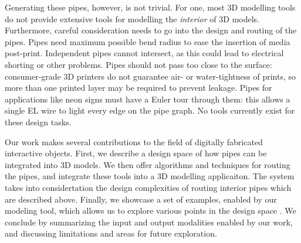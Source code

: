 Generating these pipes, however, is not trivial.  For one, most 3D modelling tools do not provide extensive tools for modelling the  {\em interior} of 3D models. Furthermore, careful consideration needs to go into the design and routing of the pipes. Pipes need maximum possible bend radius to ease the insertion of media post-print.  Independent pipes cannot intersect, as this could lead to electrical shorting or other problems.  Pipes should not pass too close to the surface: consumer-grade 3D printers do not guarantee air- or water-tightness of prints, so more than one printed layer may be required to prevent leakage.  Pipes for applications like neon signs must have a Euler tour  through them: this allows a single EL wire to light every edge on the pipe graph.  No tools currently exist for these design tasks.  

Our work makes several contributions to the field of digitally fabricated interactive objects. First, we describe a design space of how pipes can be integrated into 3D models. We then offer algorithms and techniques for routing the pipes, and integrate these tools into  a 3D modelling applicaiton. The system takes into considertation the design complexities of routing interior pipes which are described above. Finally, we showcase a set of examples, enabled by our modeling tool, which allows us to explore various points in the design space . We conclude by summarizing the input and output modalities enabled by our work, and discussing limitations and areas for future exploration. 
